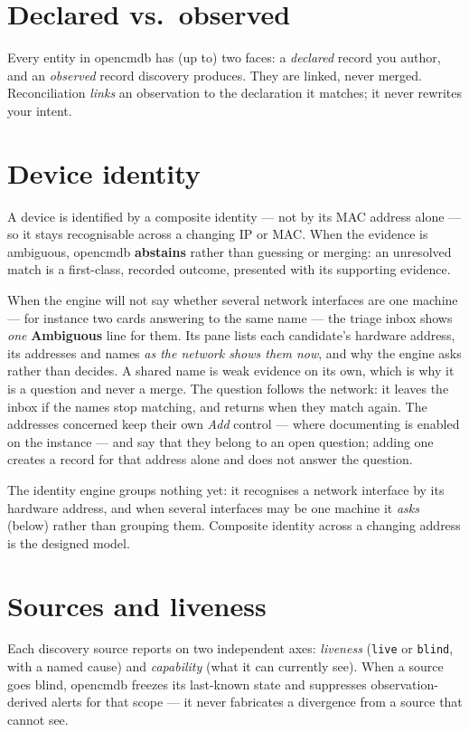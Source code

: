 \documentclass[11pt,oneside,listof=totoc,bibliography=totoc]{scrreprt}
\begin{document}
\section{Declared vs.\ observed}
Every entity in opencmdb has (up to) two faces: a \emph{declared} record you author, and an
\emph{observed} record discovery produces. They are linked, never merged. Reconciliation
\emph{links} an observation to the declaration it matches; it never rewrites your intent.

\section{Device identity}
A device is identified by a composite identity — not by its MAC address alone — so it stays
recognisable across a changing IP or MAC. When the evidence is ambiguous, opencmdb
\textbf{abstains} rather than guessing or merging: an unresolved match is a first-class,
recorded outcome, presented with its supporting evidence.

When the engine will not say whether several network interfaces are one machine --- for
instance two cards answering to the same name --- the triage inbox shows \emph{one}
\textbf{Ambiguous} line for them. Its pane lists each candidate's hardware address, its
addresses and names \emph{as the network shows them now}, and why the engine asks rather than
decides. A shared name is weak evidence on its own, which is why it is a question and never a
merge. The question follows the network: it leaves the inbox if the names stop matching, and
returns when they match again. The addresses concerned keep their own \emph{Add} control ---
where documenting is enabled on the instance --- and say that they belong to an open question;
adding one creates a record for that address alone and does not answer the question.

\begin{planned}
The identity engine groups nothing yet: it recognises a network interface by its hardware
address, and when several interfaces may be one machine it \emph{asks} (below) rather than
grouping them. Composite identity across a changing address is the designed model.
\end{planned}

\section{Sources and liveness}
Each discovery source reports on two independent axes: \emph{liveness}
(\texttt{live} or \texttt{blind}, with a named cause) and \emph{capability} (what it can
currently see). When a source goes blind, opencmdb freezes its last-known state and
suppresses observation-derived alerts for that scope — it never fabricates a divergence from
a source that cannot see.
\end{document}
